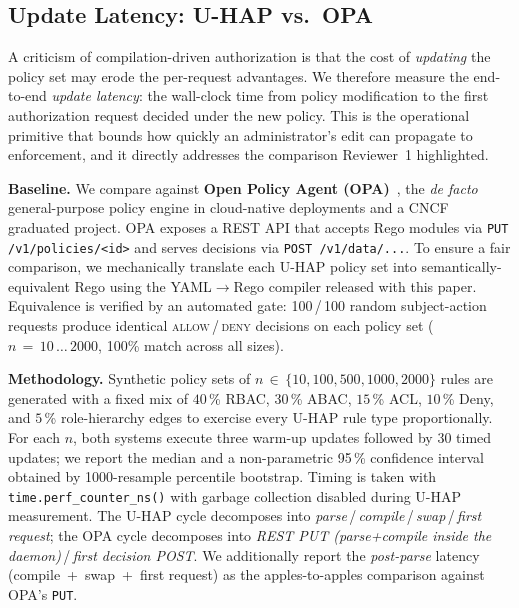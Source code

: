 
\subsection{Update Latency: U-HAP vs.\ OPA}\label{sec:exp5}

A criticism of compilation-driven authorization is that the cost of
\emph{updating} the policy set may erode the per-request advantages.
We therefore measure the end-to-end \emph{update latency}: the wall-clock
time from policy modification to the first authorization request decided
under the new policy. This is the operational primitive that bounds how
quickly an administrator's edit can propagate to enforcement, and it
directly addresses the comparison Reviewer~1 highlighted.

\smallskip
\noindent
\textbf{Baseline.}
We compare against \textbf{Open Policy Agent (OPA)}~\cite{b20}, the
\emph{de facto} general-purpose policy engine in cloud-native
deployments and a CNCF graduated project. OPA exposes a REST API
that accepts Rego modules via \texttt{PUT /v1/policies/<id>} and
serves decisions via \texttt{POST /v1/data/...}. To ensure a fair
comparison, we mechanically translate each U-HAP policy set into
semantically-equivalent Rego using the YAML$\rightarrow$Rego compiler
released with this paper. Equivalence is verified by an automated
gate: 100\,/\,100 random subject-action requests produce identical
\textsc{allow}\,/\,\textsc{deny} decisions on each policy set
($n\,{=}\,10\,\ldots\,2000$, 100\% match across all sizes).

\smallskip
\noindent
\textbf{Methodology.}
Synthetic policy sets of $n\,\in\,\{10, 100, 500, 1000, 2000\}$ rules
are generated with a fixed mix of $40$\,\% RBAC, $30$\,\% ABAC,
$15$\,\% ACL, $10$\,\% Deny, and $5$\,\% role-hierarchy edges to
exercise every U-HAP rule type proportionally. For each $n$, both
systems execute three warm-up updates followed by 30 timed updates;
we report the median and a non-parametric 95\,\% confidence interval
obtained by 1000-resample percentile bootstrap. Timing is taken with
\texttt{time.perf\_counter\_ns()} with garbage collection disabled
during U-HAP measurement. The U-HAP cycle decomposes into
\emph{parse}\,/\,\emph{compile}\,/\,\emph{swap}\,/\,\emph{first request};
the OPA cycle decomposes into \emph{REST PUT (parse+compile inside the
daemon)}\,/\,\emph{first decision POST}. We additionally report the
\emph{post-parse} latency (compile~+~swap~+~first request) as the
apples-to-apples comparison against OPA's \texttt{PUT}.

